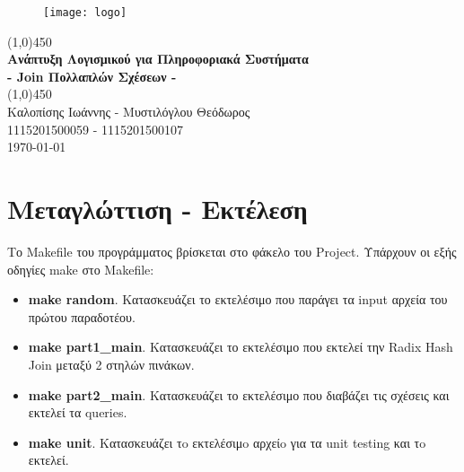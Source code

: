 \documentclass[12pt, a4paper]{article}
\begin{document}
\begin{titlepage}
\begin{center}
\vspace*{1cm}
\begin{figure}
\centering
\texttt{[image: logo]}\\
\end{figure}
\vfill
\line(1,0){450}\\[1mm]
\huge{\textbf{Ανάπτυξη Λογισμικού για Πληροφοριακά Συστήματα}}\\[3mm]
\Large{\textbf{- Join Πολλαπλών Σχέσεων -}}\\[1mm]
\line(1,0){450}\\
\vfill
Καλοπίσης Ιωάννης - Μυστιλόγλου Θεόδωρος\\
1115201500059 - 1115201500107\\
\today\\

\end{center}
\end{titlepage}

\tableofcontents
\thispagestyle{empty}
\clearpage

\setcounter{page}{1}

\section{Μεταγλώττιση - Eκτέλεση}
Το Makefile του προγράμματος βρίσκεται στο φάκελο του Project. Υπάρχουν οι εξής οδηγίες make στο Makefile:
\begin{itemize}
	\item \textbf{make random}. Κατασκευάζει το εκτελέσιμο που παράγει τα input αρχεία του πρώτου παραδοτέου.
	\item \textbf{make part1\_main}. Κατασκευάζει το εκτελέσιμο που εκτελεί την Radix Hash Join μεταξύ 2 στηλών πινάκων.
	\item \textbf{make part2\_main}. Κατασκευάζει το εκτελέσιμο που διαβάζει τις σχέσεις και εκτελεί τα queries.
	\item \textbf{make unit}. Κατασκευάζει τo εκτελέσιμo αρχείo για τα unit testing και τo εκτελεί.
\end{itemize}
\end{document}
